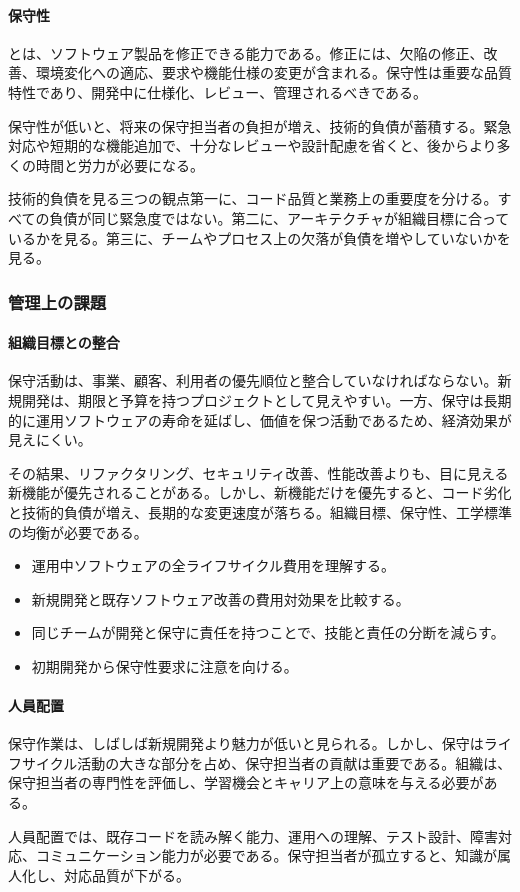 \paragraph{保守性}
とは、ソフトウェア製品を修正できる能力である。修正には、欠陥の修正、改善、環境変化への適応、要求や機能仕様の変更が含まれる。保守性は重要な品質特性であり、開発中に仕様化、レビュー、管理されるべきである。\par
保守性が低いと、将来の保守担当者の負担が増え、技術的負債が蓄積する。緊急対応や短期的な機能追加で、十分なレビューや設計配慮を省くと、後からより多くの時間と労力が必要になる。\par
\begin{pointbox}{技術的負債を見る三つの観点}第一に、コード品質と業務上の重要度を分ける。すべての負債が同じ緊急度ではない。第二に、アーキテクチャが組織目標に合っているかを見る。第三に、チームやプロセス上の欠落が負債を増やしていないかを見る。\end{pointbox}
\subsubsection{管理上の課題}
\paragraph{組織目標との整合}
保守活動は、事業、顧客、利用者の優先順位と整合していなければならない。新規開発は、期限と予算を持つプロジェクトとして見えやすい。一方、保守は長期的に運用ソフトウェアの寿命を延ばし、価値を保つ活動であるため、経済効果が見えにくい。\par
その結果、リファクタリング、セキュリティ改善、性能改善よりも、目に見える新機能が優先されることがある。しかし、新機能だけを優先すると、コード劣化と技術的負債が増え、長期的な変更速度が落ちる。組織目標、保守性、工学標準の均衡が必要である。\par
\begin{itemize}
\item 運用中ソフトウェアの全ライフサイクル費用を理解する。
\item 新規開発と既存ソフトウェア改善の費用対効果を比較する。
\item 同じチームが開発と保守に責任を持つことで、技能と責任の分断を減らす。
\item 初期開発から保守性要求に注意を向ける。
\end{itemize}
\paragraph{人員配置}
保守作業は、しばしば新規開発より魅力が低いと見られる。しかし、保守はライフサイクル活動の大きな部分を占め、保守担当者の貢献は重要である。組織は、保守担当者の専門性を評価し、学習機会とキャリア上の意味を与える必要がある。\par
人員配置では、既存コードを読み解く能力、運用への理解、テスト設計、障害対応、コミュニケーション能力が必要である。保守担当者が孤立すると、知識が属人化し、対応品質が下がる。\par
